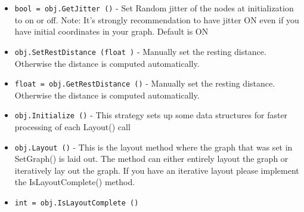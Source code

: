 \begin{itemize}
\item  \verb|bool = obj.GetJitter ()| -  Set Random jitter of the nodes at initialization
 to on or off.
 Note: It's strongly recommendation to have jitter ON
 even if you have initial coordinates in your graph. 
 Default is ON

\item  \verb|obj.SetRestDistance (float )| -  Manually set the resting distance. Otherwise the
 distance is computed automatically.

\item  \verb|float = obj.GetRestDistance ()| -  Manually set the resting distance. Otherwise the
 distance is computed automatically.

\item  \verb|obj.Initialize ()| -  This strategy sets up some data structures
 for faster processing of each Layout() call

\item  \verb|obj.Layout ()| -  This is the layout method where the graph that was
 set in SetGraph() is laid out. The method can either
 entirely layout the graph or iteratively lay out the
 graph. If you have an iterative layout please implement
 the IsLayoutComplete() method.

\item  \verb|int = obj.IsLayoutComplete ()|

\end{itemize}
